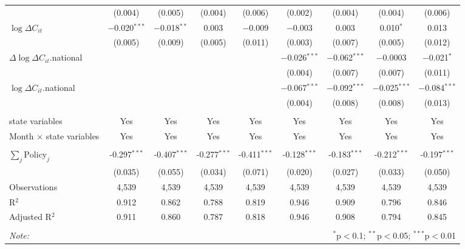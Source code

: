 \begin{tabular}{@{\extracolsep{1pt}}lcccccccc}
  & (0.004) & (0.005) & (0.004) & (0.006) & (0.002) & (0.004) & (0.004) & (0.006) \\ 
  $\log \Delta C_{it}$ & $-$0.020$^{***}$ & $-$0.018$^{**}$ & 0.003 & $-$0.009 & $-$0.003 & 0.003 & 0.010$^{*}$ & 0.013 \\ 
  & (0.005) & (0.009) & (0.005) & (0.011) & (0.003) & (0.007) & (0.005) & (0.012) \\ 
  $\Delta \log \Delta C_{it}$.national &  &  &  &  & $-$0.026$^{***}$ & $-$0.062$^{***}$ & $-$0.0003 & $-$0.021$^{*}$ \\ 
  &  &  &  &  & (0.004) & (0.007) & (0.007) & (0.011) \\ 
  $\log \Delta C_{it}$.national &  &  &  &  & $-$0.067$^{***}$ & $-$0.092$^{***}$ & $-$0.025$^{***}$ & $-$0.084$^{***}$ \\ 
  &  &  &  &  & (0.004) & (0.008) & (0.008) & (0.013) \\ 
 \hline \\[-1.8ex] 
state variables & Yes & Yes & Yes & Yes & Yes & Yes & Yes & Yes \\ 
Month $\times$ state variables & Yes & Yes & Yes & Yes & Yes & Yes & Yes & Yes \\ 
\hline \\[-1.8ex] 
$\sum_j \mathrm{Policy}_j$ & -0.297$^{***}$ & -0.407$^{***}$ & -0.277$^{***}$ & -0.411$^{***}$ & -0.128$^{***}$ & -0.183$^{***}$ & -0.212$^{***}$ & -0.197$^{***}$ \\ 
 & (0.035) & (0.055) & (0.034) & (0.071) & (0.020) & (0.027) & (0.033) & (0.050) \\ 
Observations & 4,539 & 4,539 & 4,539 & 4,539 & 4,539 & 4,539 & 4,539 & 4,539 \\ 
R$^{2}$ & 0.912 & 0.862 & 0.788 & 0.819 & 0.946 & 0.909 & 0.796 & 0.846 \\ 
Adjusted R$^{2}$ & 0.911 & 0.860 & 0.787 & 0.818 & 0.946 & 0.908 & 0.794 & 0.845 \\ 
\hline 
\hline \\[-1.8ex] 
\textit{Note:}  & \multicolumn{8}{r}{$^{*}$p$<$0.1; $^{**}$p$<$0.05; $^{***}$p$<$0.01} \\ 
\end{tabular} 